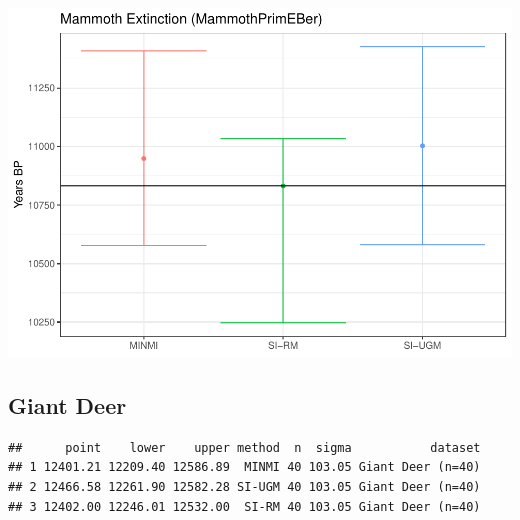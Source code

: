 \documentclass[
]{article}
\newenvironment{Shaded}{\begin{snugshade}}{\end{snugshade}}
\newcommand{\AttributeTok}[1]{\textcolor[rgb]{0.77,0.63,0.00}{#1}}
\newcommand{\DecValTok}[1]{\textcolor[rgb]{0.00,0.00,0.81}{#1}}
\newcommand{\FunctionTok}[1]{\textcolor[rgb]{0.00,0.00,0.00}{#1}}
\newcommand{\NormalTok}[1]{#1}
\newcommand{\OtherTok}[1]{\textcolor[rgb]{0.56,0.35,0.01}{#1}}
\newcommand{\SpecialCharTok}[1]{\textcolor[rgb]{0.00,0.00,0.00}{#1}}
\newcommand{\StringTok}[1]{\textcolor[rgb]{0.31,0.60,0.02}{#1}}
\begin{document}
\includegraphics{applications_files/figure-latex/unnamed-chunk-6-1.pdf}

\hypertarget{giant-deer}{%
\subsection{Giant Deer}\label{giant-deer}}

\begin{Shaded}
\end{Shaded}

\begin{verbatim}
##      point    lower    upper method  n  sigma           dataset
## 1 12401.21 12209.40 12586.89  MINMI 40 103.05 Giant Deer (n=40)
## 2 12466.58 12261.90 12582.28 SI-UGM 40 103.05 Giant Deer (n=40)
## 3 12402.00 12246.01 12532.00  SI-RM 40 103.05 Giant Deer (n=40)
\end{verbatim}
\end{document}

